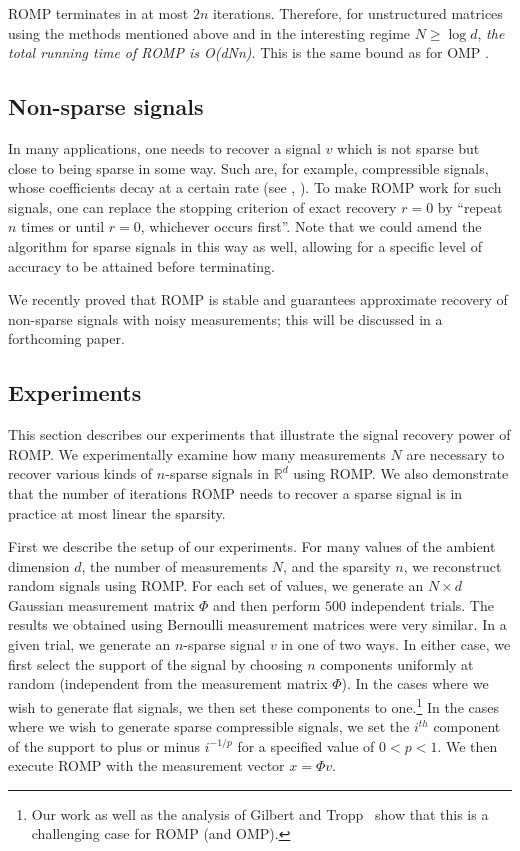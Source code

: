 \documentclass[12pt]{amsart}
\theoremstyle{plain}
\theoremstyle{definition}
\theoremstyle{remark}
\numberwithin{equation}{section}
\begin{document}
ROMP terminates in at most $2n$ iterations. Therefore, for unstructured 
matrices using the methods mentioned above and in the interesting regime $N \ge \log d$, 
{\em the total running time of ROMP is O(dNn)}. This is the same bound as for OMP
\cite{TG}. 

\subsection{Non-sparse signals}

In many applications, one needs to recover a signal $v$ which is not sparse
but close to being sparse in some way. Such are, for example, compressible
signals, whose coefficients decay at a certain rate (see \cite{Do},
\cite{CT}).
To make ROMP work for such signals, one can replace the stopping criterion
of exact recovery $r=0$ by ``repeat $n$ times or until $r=0$, whichever
occurs first''. Note that we could amend the algorithm for sparse signals
in this way as well, allowing for a specific level of accuracy to be attained
before terminating.

We recently proved that ROMP
is stable and guarantees approximate recovery of non-sparse signals with noisy measurements; this
will be discussed in a forthcoming paper.

\subsection{Experiments}

This section describes our experiments that illustrate the signal recovery power of ROMP.
We experimentally examine how many measurements $N$ are necessary to recover various kinds of $n$-sparse
signals in ${\mathbb{R}}^d$ using ROMP. 
We also demonstrate that the number of iterations ROMP needs to recover a sparse signal is
in practice at most linear the sparsity. 

First we describe the setup of our experiments. For many values of the ambient dimension $d$, 
the number of measurements $N$, and the sparsity $n$, we reconstruct random signals using ROMP.
For each set of values, we generate an $N \times d$ Gaussian measurement matrix $\Phi$ and then perform $500$ independent trials. The results
we obtained using Bernoulli measurement matrices were very similar.
In a given trial, we generate an $n$-sparse signal $v$ in one of two ways. In either case, we first select the support of the signal by choosing $n$ components uniformly 
at random (independent from the measurement matrix $\Phi$). In the cases where we wish to generate flat signals, we then  set these components to one.\footnote{Our work as well as the analysis of Gilbert and Tropp~\cite{TG}
show that this is a challenging case for ROMP (and OMP). } In the cases where we wish to generate sparse compressible signals, we set the $i^{th}$ component of the support to plus or minus $i^{-1/p}$ for a specified value of $0 < p < 1$. We then execute ROMP with the measurement
vector $x = \Phi v$.  
\end{document}
